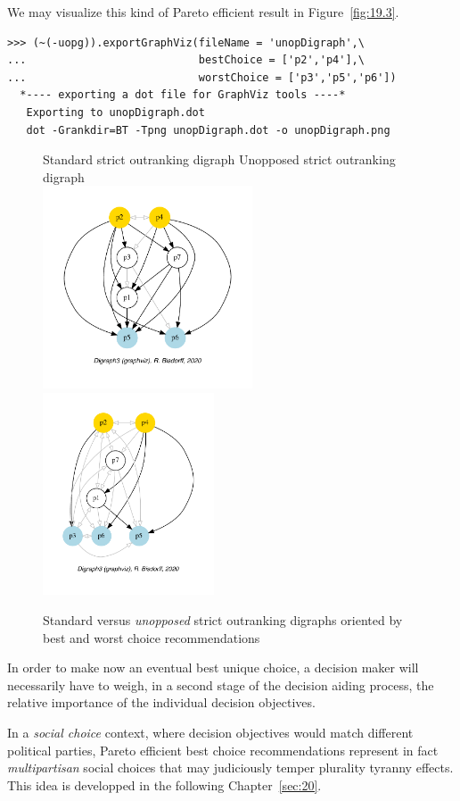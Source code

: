 We may visualize this kind of Pareto efficient result in Figure~\vref{fig:19.3}.
\begin{lstlisting}
>>> (~(-uopg)).exportGraphViz(fileName = 'unopDigraph',\
...                           bestChoice = ['p2','p4'],\
...                           worstChoice = ['p3','p5','p6'])
  *---- exporting a dot file for GraphViz tools ----*
   Exporting to unopDigraph.dot
   dot -Grankdir=BT -Tpng unopDigraph.dot -o unopDigraph.png
\end{lstlisting}
\begin{figure}[ht]
  Standard strict outranking digraph \hfill Unopposed strict outranking digraph \\
  \includegraphics[height=6cm]{Figures/19-1-stdg.pdf}\hfill
  \includegraphics[height=6cm]{Figures/19-3-unopDigraph.pdf}
\caption{Standard versus \emph{unopposed} strict outranking digraphs oriented by best and worst choice recommendations} 
\label{fig:19.3}       %
\end{figure}

In order to make now an eventual best unique choice, a decision maker will necessarily have to weigh, in a second stage of the decision aiding process, the relative importance of the individual decision objectives.

In a \emph{social choice} context, where decision objectives would match different political parties, Pareto efficient best choice recommendations represent in fact \emph{multipartisan} social choices that may judiciously temper plurality tyranny effects. This idea is developped in the following Chapter~\ref{sec:20}.

